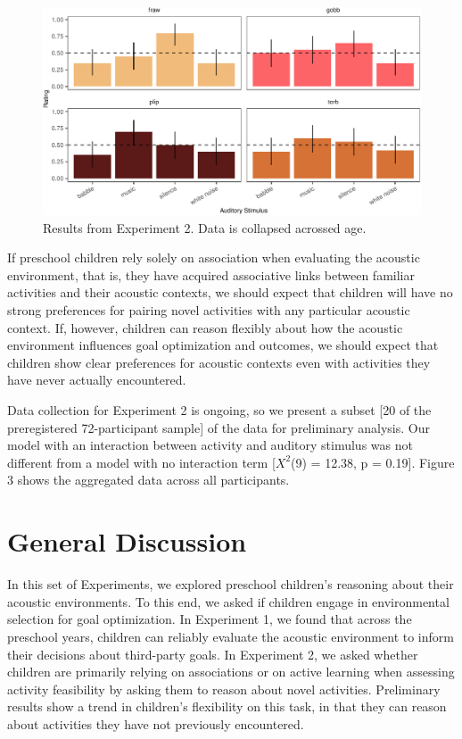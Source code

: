 \documentclass[10pt, letterpaper]{article}
\newenvironment{CodeChunk}{}{}
\begin{document}
\begin{CodeChunk}
\begin{figure}[t]

{\centering \includegraphics{figs/e4b-bar-1} 

}

\caption[Results from Experiment 2]{Results from Experiment 2. Data is collapsed acrossed age.}\label{fig:e4b-bar}
\end{figure}
\end{CodeChunk}

If preschool children rely solely on association when evaluating the
acoustic environment, that is, they have acquired associative links
between familiar activities and their acoustic contexts, we should
expect that children will have no strong preferences for pairing novel
activities with any particular acoustic context. If, however, children
can reason flexibly about how the acoustic environment influences goal
optimization and outcomes, we should expect that children show clear
preferences for acoustic contexts even with activities they have never
actually encountered.

Data collection for Experiment 2 is ongoing, so we present a subset
{[}20 of the preregistered 72-participant sample{]} of the data for
preliminary analysis. Our model with an interaction between activity and
auditory stimulus was not different from a model with no interaction
term {[}\(X^2\)(9) = 12.38, p = 0.19{]}. Figure 3 shows the aggregated
data across all participants.

\hypertarget{general-discussion}{%
\section{General Discussion}\label{general-discussion}}

In this set of Experiments, we explored preschool children's reasoning
about their acoustic environments. To this end, we asked if children
engage in environmental selection for goal optimization. In Experiment
1, we found that across the preschool years, children can reliably
evaluate the acoustic environment to inform their decisions about
third-party goals. In Experiment 2, we asked whether children are
primarily relying on associations or on active learning when assessing
activity feasibility by asking them to reason about novel activities.
Preliminary results show a trend in children's flexibility on this task,
in that they can reason about activities they have not previously
encountered.
\end{document}
